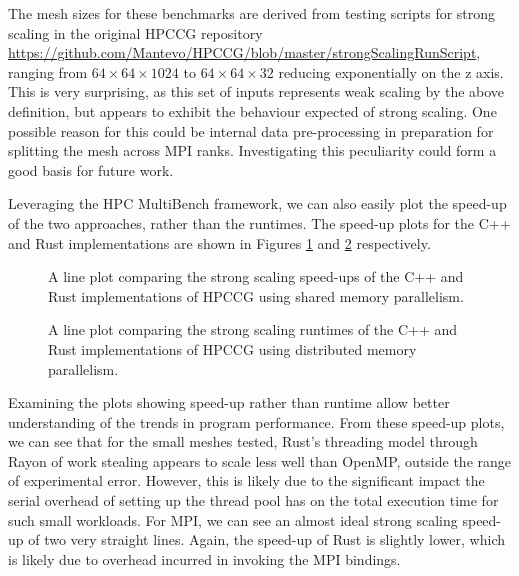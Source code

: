 The mesh sizes for these benchmarks are derived from testing scripts for strong scaling in the original HPCCG repository \url{https://github.com/Mantevo/HPCCG/blob/master/strongScalingRunScript}, ranging from $64 \times 64 \times 1024$ to $64 \times 64 \times 32$ reducing exponentially on the z axis. This is very surprising, as this set of inputs represents weak scaling by the above definition, but appears to exhibit the behaviour expected of strong scaling. One possible reason for this could be internal data pre-processing in preparation for splitting the mesh across MPI ranks. Investigating this peculiarity could form a good basis for future work.

Leveraging the HPC MultiBench framework, we can also easily plot the speed-up of the two approaches, rather than the runtimes. The speed-up plots for the C++ and Rust implementations are shown in Figures \ref{fig:strong_scaling_speedup_threaded} and \ref{fig:strong_scaling_speedup_mpi} respectively.

\begin{figure}[H]
    \centering
    
    \caption{A line plot comparing the strong scaling speed-ups of the C++ and Rust implementations of HPCCG using shared memory parallelism.}
    \label{fig:strong_scaling_speedup_threaded}
\end{figure}

\begin{figure}[H]
    \centering
    
    \caption{A line plot comparing the strong scaling runtimes of the C++ and Rust implementations of HPCCG using distributed memory parallelism.}
    \label{fig:strong_scaling_speedup_mpi}
\end{figure}

Examining the plots showing speed-up rather than runtime allow better understanding of the trends in program performance. From these speed-up plots, we can see that for the small meshes tested, Rust's threading model through Rayon of work stealing appears to scale less well than OpenMP, outside the range of experimental error. However, this is likely due to the significant impact the serial overhead of setting up the thread pool has on the total execution time for such small workloads. For MPI, we can see an almost ideal strong scaling speed-up of two very straight lines. Again, the speed-up of Rust is slightly lower, which is likely due to overhead incurred in invoking the MPI bindings.

